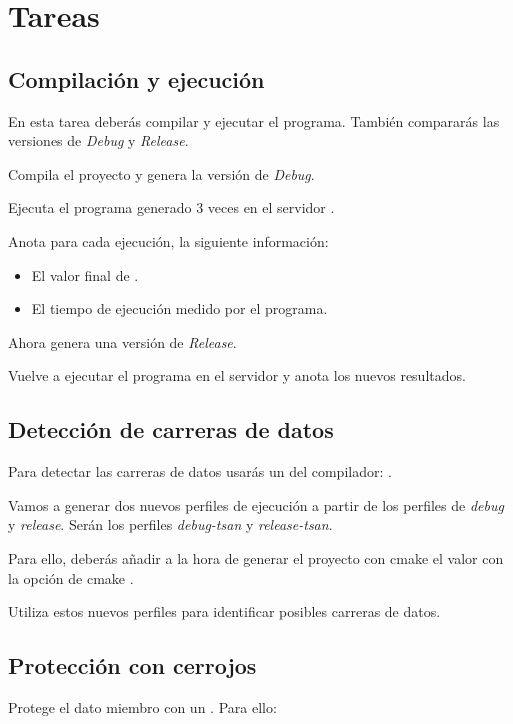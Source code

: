 \section{Tareas}

\subsection{Compilación y ejecución}

En esta tarea deberás compilar y ejecutar el programa. 
También compararás las versiones de \emph{Debug} y \emph{Release}.

Compila el proyecto y genera la versión de \emph{Debug}.

Ejecuta el programa generado 3 veces en el servidor . 

Anota para cada ejecución, la siguiente información:
\begin{itemize}
\item El valor final de .
\item El tiempo de ejecución medido por el programa.
\end{itemize}

Ahora genera una versión de \emph{Release}.

Vuelve a ejecutar el programa en el servidor  y anota los nuevos resultados.

\subsection{Detección de carreras de datos}

Para detectar las carreras de datos usarás un  del compilador: 
.

Vamos a generar dos nuevos perfiles de ejecución a partir de los perfiles de 
\emph{debug} y \emph{release}. Serán los perfiles \emph{debug-tsan} y \emph{release-tsan}.

Para ello, deberás añadir a la hora de generar el proyecto con cmake el valor
 con la opción de cmake .

Utiliza estos nuevos perfiles para identificar posibles carreras de datos.

\subsection{Protección con cerrojos}

Protege el dato miembro  con un . Para ello:


